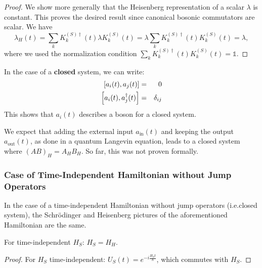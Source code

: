 \begin{proof}
    We show more generally that the Heisenberg representation of a scalar $\lambda$ is constant. This proves the desired result since canonical bosonic commutators are scalar. We have
    \begin{equation}
        \lambda_H(t) = \sum_k K^{(S) \dagger}_k(t) \lambda K^{(S)}_k(t) = \lambda \sum_k K^{(S) \dagger}_k(t) K^{(S)}_k(t) = \lambda,
    \end{equation}
    where we used the normalization condition $\sum_k K^{(S) \dagger}_k(t) K^{(S)}_k(t)  = \mathbb{1}$.
\end{proof}

\begin{corollary}
    In the case of a \textbf{closed} system, we can write:
    \begin{eqnarray}
        \commutator{a_i(t)}{a_j(t)} &=& 0\\
        \commutator{a_i(t)}{a^\dagger_j(t)} &=& \delta_{i j}
    \end{eqnarray}
    This shows that $a_i(t)$ describes a boson for a closed system.
\end{corollary}

\begin{remark}
    We expect that adding the external input $a_{\text{in}}(t)$ and keeping the output $a_{\text{out}}(t)$, as done in a quantum Langevin equation, leads to a closed system where $(A B)_H = A_H B_H$. So far, this was not proven formally.
\end{remark}


\subsubsection{Case of Time-Independent Hamiltonian without Jump Operators}

In the case of a time-independent Hamiltonian without jump operators (i.e.\@ closed system), the Schrödinger and Heisenberg pictures of the aforementioned Hamiltonian are the same.

\begin{theorem}
    For time-independent $H_S$: $H_S = H_H$.
\end{theorem}

\begin{proof}
    For $H_S$ time-independent: $U_S(t) = e^{-i\frac{H_S t}{\hbar}}$, which commutes with $H_S$.
\end{proof}

